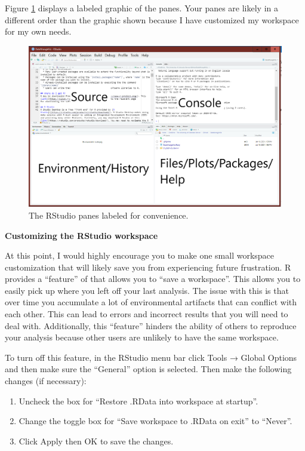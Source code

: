 \documentclass[
]{book}
\providecommand{\tightlist}{%
  \setlength{\itemsep}{0pt}\setlength{\parskip}{0pt}}
\theoremstyle{definition}
\theoremstyle{definition}
\theoremstyle{definition}
\theoremstyle{definition}
\theoremstyle{remark}
\begin{document}
Figure \ref{fig:rstudiopanes} displays a labeled graphic of the panes. Your panes are likely in a different order than the graphic shown because I have customized my workspace for my own needs.

\begin{figure}
\includegraphics[width=0.9\linewidth]{pictures/rstudio_panes} \caption{The RStudio panes labeled for convenience.}\label{fig:rstudiopanes}
\end{figure}

\textbf{Customizing the RStudio workspace}

At this point, I would highly encourage you to make one small workspace customization that will likely save you from experiencing future frustration. R provides a ``feature'' of that allows you to ``save a workspace''. This allows you to easily pick up where you left off your last analysis. The issue with this is that over time you accumulate a lot of environmental artifacts that can conflict with each other. This can lead to errors and incorrect results that you will need to deal with. Additionally, this ``feature'' hinders the ability of others to reproduce your analysis because other users are unlikely to have the same workspace.

To turn off this feature, in the RStudio menu bar click Tools → Global Options and then make sure the ``General'' option is selected. Then make the following changes (if necessary):

\begin{enumerate}
\def\labelenumi{\arabic{enumi}.}
\tightlist
\item
  Uncheck the box for ``Restore .RData into workspace at startup''.
\item
  Change the toggle box for ``Save workspace to .RData on exit'' to ``Never''.
\item
  Click Apply then OK to save the changes.
\end{enumerate}
\end{document}
